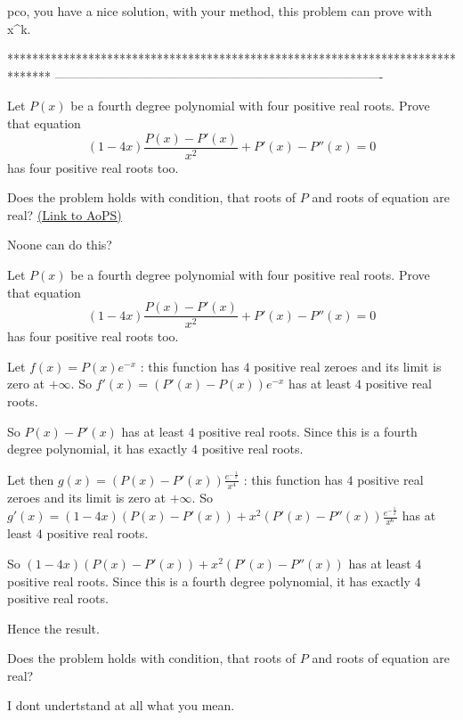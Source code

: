 \begin{solution}
	pco, you have a nice solution, with your method, this problem can prove with x^k.
\end{solution}
*******************************************************************************
-------------------------------------------------------------------------------

\begin{problem}
	Let $ P(x)$ be a fourth degree polynomial with four positive real roots. Prove that equation 
\[ (1-4x) \frac{P(x)-P'(x)}{x^2} + P'(x)-P''(x)=0\]
has four positive real roots too.

Does the problem holds with condition, that roots of $ P$ and roots of equation are real?
	\flushright \href{https://artofproblemsolving.com/community/c6h300702}{(Link to AoPS)}
\end{problem}



\begin{solution}
	Noone can do this?
\end{solution}



\begin{solution}
	\begin{tcolorbox}Let $ P(x)$ be a fourth degree polynomial with four positive real roots. Prove that equation
\[ (1 - 4x) \frac {P(x) - P'(x)}{x^2} + P'(x) - P''(x) = 0\]
has four positive real roots too.\end{tcolorbox}

Let $ f(x)=P(x)e^{-x}$ : this function has $ 4$ positive real zeroes and its limit is zero at $ +\infty$. So $ f'(x)=(P'(x)-P(x))e^{-x}$ has at least $ 4$ positive real roots.

So $ P(x)-P'(x)$ has at least $ 4$ positive real roots. Since this is a fourth degree polynomial, it has exactly $ 4$ positive real roots.

Let then $ g(x)=(P(x)-P'(x))\frac{e^{-\frac 1x}}{x^4}$ : this function has $ 4$ positive real zeroes and its limit is zero at $ +\infty$. So $ g'(x)=(1-4x)(P(x)-P'(x))+x^2(P'(x)-P''(x))\frac{e^{-\frac 1x}}{x^6}$ has at least $ 4$ positive real roots.

So $ (1-4x)(P(x)-P'(x))+x^2(P'(x)-P''(x))$ has at least $ 4$ positive real roots. Since this is a fourth degree polynomial, it has exactly $ 4$ positive real roots.

Hence the result.

\begin{tcolorbox}Does the problem holds with condition, that roots of $ P$ and roots of equation are real?\end{tcolorbox}

I dont undertstand at all what you mean.
\end{solution}



